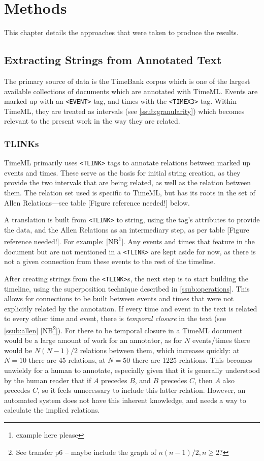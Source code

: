 \documentclass[a4paper,12pt,leqno]{article}
\newcommand{\xmltag}[2][]{\texttt{\textless{}#2#1\textgreater{}}}
\newcommand{\refneeded}[1][]{{\color{red}[Figure reference needed!#1]}}
\newcommand{\selfnote}[1]{{\color{red}[NB\footnote{{\color{red}#1}}]}}
\newcommand{\nb}{\selfnote}
\begin{document}
\newpage
\section{Methods}\label{sec:methods}
This chapter details the approaches that were taken to produce the results.

\subsection{Extracting Strings from Annotated Text}\label{sub:extracting}
The primary source of data is the TimeBank corpus which is one of the largest available collections of documents which are annotated with TimeML. Events are marked up with an \xmltag{EVENT} tag, and times with the \xmltag{TIMEX3} tag. Within TimeML, they are treated as intervals (see \cref{ssub:granularity}) which becomes relevant to the present work in the way they are related.

\subsubsection{TLINKs}\label{ssub:tlinks}
TimeML primarily uses \xmltag{TLINK} tags to annotate relations between marked up events and times. These serve as the basis for initial string creation, as they provide the two intervals that are being related, as well as the relation between them. The relation set used is specific to TimeML, but has its roots in the set of Allen Relations---see table \refneeded{} below.

A translation is built from \xmltag{TLINK} to string, using the tag's attributes to provide the data, and the Allen Relations as an intermediary step, as per table \refneeded{}. For example: \nb{example here please}. Any events and times that feature in the document but are not mentioned in a \xmltag{TLINK} are kept aside for now, as there is not a given connection from these events to the rest of the timeline.

After creating strings from the \xmltag{TLINK}s, the next step is to start building the timeline, using the superposition technique described in \cref{ssub:operations}. This allows for connections to be built between events and times that were not explicitly related by the annotation. If every time and event in the text is related to every other time and event, there is \textit{temporal closure} in the text (see \cref{ssub:allen} \nb{See transfer p6 -- maybe include the graph of $n(n-1)/2, n \ge 2$?}). For there to be temporal closure in a TimeML document would be a large amount of work for an annotator, as for $N$ events/times there would be $N(N - 1) / 2$ relations between them, which increases quickly: at $N = 10$ there are 45 relations, at $N = 50$ there are 1225 relations. This becomes unwieldy for a human to annotate, especially given that it is generally understood by the human reader that if $A$ precedes $B$, and $B$ precedes $C$, then $A$ also precedes $C$, so it feels unnecessary to include this latter relation. However, an automated system does not have this inherent knowledge, and needs a way to calculate the implied relations.
\end{document}
